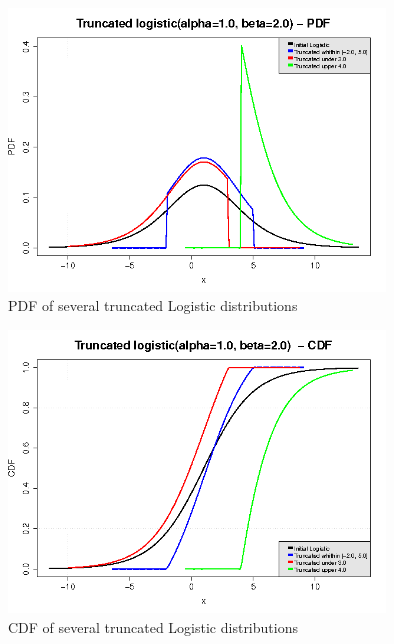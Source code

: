 \begin{figure}[H]
  \begin{center}
    \includegraphics[width=10cm]{truncatedDistribution_pdf.png}
  \end{center}
  \caption{PDF of several truncated Logistic distributions}
  \label{truncatedDistribution_pdf}
\end{figure}

\begin{figure}[H]
  \begin{center}
    \includegraphics[width=10cm]{truncatedDistribution_cdf.png}
  \end{center}
  \caption{CDF of several truncated Logistic distributions}
  \label{truncatedDistribution_cdf}
\end{figure}

